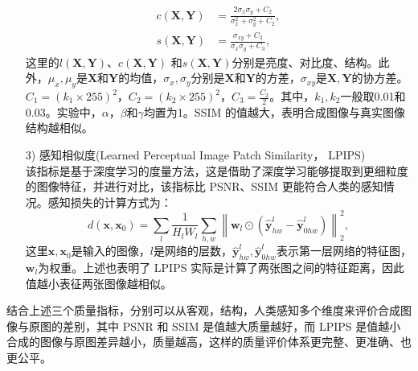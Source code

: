 \begin{enumerate}
\begin{align}
        c\left(\symbf{X}, \symbf{Y}\right) &= \frac{2\sigma_{x}\sigma_{y} + C_{2}}{\sigma_{x}^{2} + \sigma_{y}^{2} + C_{2}}, \\
        s\left(\symbf{X}, \symbf{Y}\right) &= \frac{\sigma_{xy} + C_{3}}{\sigma_{x}\sigma_{y} + C_{3}},
    \end{align}
    这里的$l\left(\symbf{X}, \symbf{Y}\right)$、$c\left(\symbf{X}, \symbf{Y}\right)$ 和$s\left(\symbf{X}, \symbf{Y}\right)$分别是亮度、对比度、结构。此外，$\mu_{x}, \mu_{y}$是$\symbf{X}$和$\symbf{Y}$的均值，$\sigma_{x},\sigma_{y}$分别是$\symbf{X}$和$\symbf{Y}$的方差，$\sigma_{xy}$是$\symbf{X}, \symbf{Y}$的协方差。$C_{1} = \left(k_{1} \times 255\right)^{2}$，$C_{2} = \left(k_{2} \times 255\right)^{2}$，$C_3 = \frac{C_2}{2}$。其中，$k_1, k_2$一般取0.01和0.03。实验中，$\alpha$，$\beta$和$\gamma$均置为1。SSIM 的值越大，表明合成图像与真实图像结构越相似。\\
    \item [3)]感知相似度(Learned Perceptual Image Patch Similarity， LPIPS\cite{zhang2018unreasonable}) \\
    该指标是基于深度学习的度量方法，这是借助了深度学习能够提取到更细粒度的图像特征，并进行对比，该指标比 PSNR、SSIM 更能符合人类的感知情况。感知损失的计算方式为：
    \begin{equation}
        d\left(\symbf{x}, \symbf{x}_{0}\right) = \sum_{l}\frac{1}{H_{l}W_{l}}\sum_{h, w} \left\| \symbf{w}_{l}\odot \left(\hat{\symbf{y}}_{hw}^{l} - \hat{\symbf{y}}_{0hw}^{l}\right)\right\|_{2}^{2},
    \end{equation}
    这里$\symbf{x}, \symbf{x}_{0}$是输入的图像，$l$是网络的层数，$\hat{\symbf{y}}_{hw}^{l}, \hat{\symbf{y}}_{0hw}^{l}$表示第一层网络的特征图，$\symbf{w}_{l}$为权重。上述也表明了 LPIPS 实际是计算了两张图之间的特征距离，因此值越小表征两张图像越相似。\\
\end{enumerate}

结合上述三个质量指标，分别可以从客观，结构，人类感知多个维度来评价合成图像与原图的差别，其中 PSNR 和 SSIM 是值越大质量越好，而 LPIPS 是值越小合成的图像与原图差异越小，质量越高，这样的质量评价体系更完整、更准确、也更公平。


